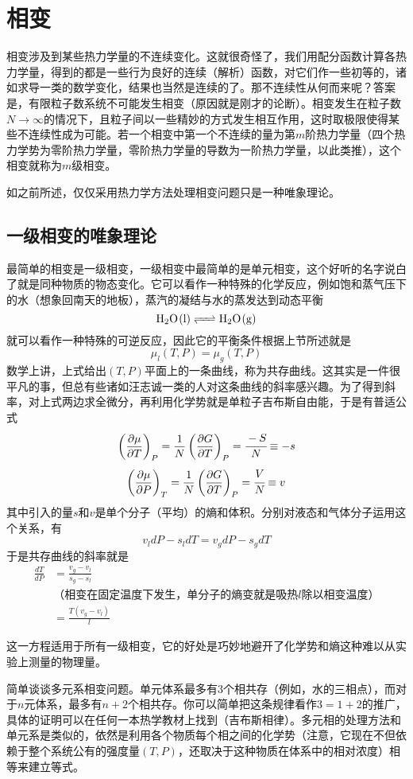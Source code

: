\documentclass[a4paper,11pt]{ctexart}
\newcommand{\beq}{\begin{equation}}
\newcommand{\eeq}{\end{equation}}
\newcommand{\bea}{\begin{equation}\begin{aligned}}
\newcommand{\eea}{\end{aligned}\end{equation}}
\newcommand{\red}{\color{red}}
\begin{document}
\section{相变}
相变涉及到某些热力学量的不连续变化。这就很奇怪了，我们用配分函数计算各热力学量，得到的都是一些行为良好的连续（解析）函数，对它们作一些初等的，诸如求导一类的数学变化，结果也当然是连续的了。那不连续性从何而来呢？答案是，{\red 有限粒子数系统不可能发生相变}（原因就是刚才的论断）。相变发生在粒子数$N \to \infty$的情况下，且粒子间以一些精妙的方式发生相互作用，这时取极限使得某些不连续性成为可能。若一个相变中第一个不连续的量为第$m$阶热力学量（四个热力学势为零阶热力学量，零阶热力学量的导数为一阶热力学量，以此类推），这个相变就称为{\red $m$级相变}。
\par
如之前所述，仅仅采用热力学方法处理相变问题只是一种唯象理论。
\subsection{一级相变的唯象理论}
最简单的相变是一级相变，一级相变中最简单的是单元相变，这个好听的名字说白了就是同种物质的物态变化。它可以看作一种特殊的化学反应，例如饱和蒸气压下的水（想象回南天的地板），蒸汽的凝结与水的蒸发达到动态平衡
\beq
\ce{H2O(l) <=> H2O(g)}
\eeq
就可以看作一种特殊的可逆反应，因此它的平衡条件根据上节所述就是
\beq
\mu_l(T,P) = \mu_g(T,P)
\eeq
数学上讲，上式给出$(T,P)$平面上的一条曲线，称为共存曲线。这其实是一件很平凡的事，但总有些诸如汪志诚一类的人对这条曲线的斜率感兴趣。为了得到斜率，对上式两边求全微分，再利用化学势就是单粒子吉布斯自由能，于是有普适公式
\beq
\left(\frac{\partial \mu}{\partial T}\right)_P = \frac{1}{N} \left(\frac{\partial G}{\partial T}\right)_P = \cfrac{-S}{N} \equiv -s
\eeq
\beq
\left(\frac{\partial \mu}{\partial P}\right)_T = \frac{1}{N} \left(\frac{\partial G}{\partial T}\right)_P = \cfrac{V}{N} \equiv v 
\eeq
其中引入的量$s$和$v$是单个分子（平均）的熵和体积。分别对液态和气体分子运用这个关系，有
\beq
v_l dP - s_l dT = v_g dP - s_g dT
\eeq
于是共存曲线的斜率就是
\bea
\frac{dT}{dP} &= \frac{v_g - v_l}{s_g - s_l} \\
&\text{（相变在固定温度下发生，单分子的熵变就是吸热$l$除以相变温度）} \\
&= \frac{T(v_g - v_l)}{l}
\eea
\par
这一方程适用于所有一级相变，它的好处是巧妙地避开了化学势和熵这种难以从实验上测量的物理量。
\par
简单谈谈多元系相变问题。单元体系最多有3个相共存（例如，水的三相点），{\red 而对于$n$元体系，最多有$n+2$个相共存}。你可以简单把这条规律看作$3 = 1+2$的推广，具体的证明可以在任何一本热学教材上找到（{\red 吉布斯相律}）。多元相的处理方法和单元系是类似的，依然是利用各个物质每个相之间的化学势（注意，它现在不但依赖于整个系统公有的强度量$(T,P)$，还取决于这种物质在体系中的相对浓度）相等来建立等式。
\end{document}
